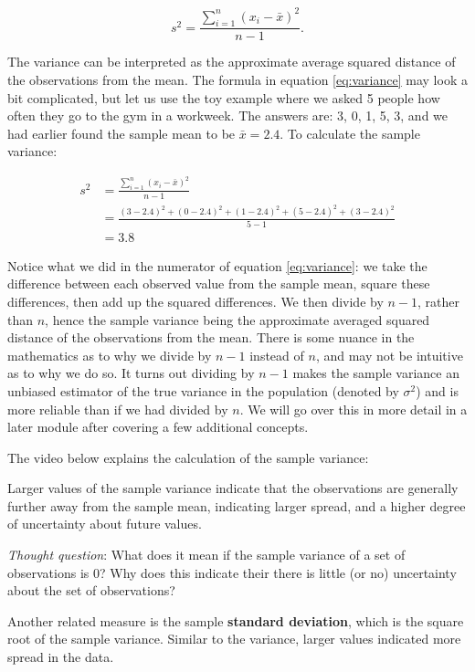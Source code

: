 \documentclass[
]{book}
\begin{document}
\begin{equation} 
s^2 = \frac{\sum_{i=1}^n (x_i-\bar{x})^2}{n-1}.
\label{eq:variance}
\end{equation}

The variance can be interpreted as the approximate average squared distance of the observations from the mean. The formula in equation \eqref{eq:variance} may look a bit complicated, but let us use the toy example where we asked 5 people how often they go to the gym in a workweek. The answers are: 3, 0, 1, 5, 3, and we had earlier found the sample mean to be \(\bar{x} = 2.4\). To calculate the sample variance:

\[
\begin{split}
s^2 &= \frac{\sum_{i=1}^n (x_i-\bar{x})^2}{n-1}\\
 &= \frac{(3-2.4)^2 + (0-2.4)^2 + (1-2.4)^2 + (5-2.4)^2 + (3-2.4)^2}{5-1} \\
&= 3.8 
\end{split}
\]

Notice what we did in the numerator of equation \eqref{eq:variance}: we take the difference between each observed value from the sample mean, square these differences, then add up the squared differences. We then divide by \(n-1\), rather than \(n\), hence the sample variance being the approximate averaged squared distance of the observations from the mean. There is some nuance in the mathematics as to why we divide by \(n-1\) instead of \(n\), and may not be intuitive as to why we do so. It turns out dividing by \(n-1\) makes the sample variance an unbiased estimator of the true variance in the population (denoted by \(\sigma^2\)) and is more reliable than if we had divided by \(n\). We will go over this in more detail in a later module after covering a few additional concepts.

The video below explains the calculation of the sample variance:

Larger values of the sample variance indicate that the observations are generally further away from the sample mean, indicating larger spread, and a higher degree of uncertainty about future values.

\emph{Thought question}: What does it mean if the sample variance of a set of observations is 0? Why does this indicate their there is little (or no) uncertainty about the set of observations?

Another related measure is the sample \textbf{standard deviation}, which is the square root of the sample variance. Similar to the variance, larger values indicated more spread in the data.
\end{document}
